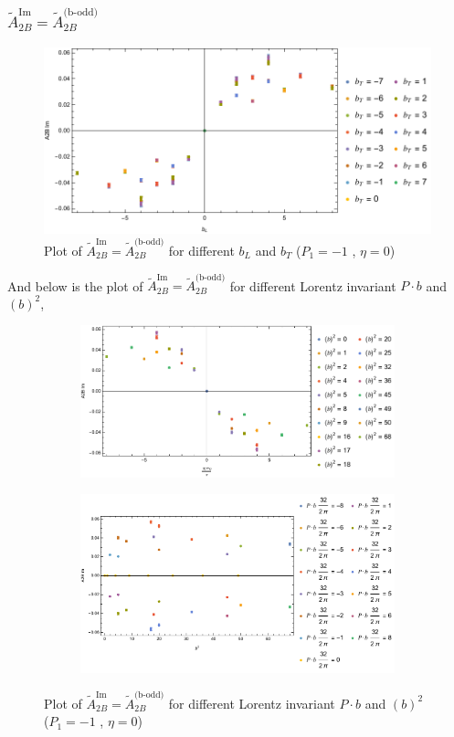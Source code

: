 \documentclass[]{article}
\numberwithin{equation}{section}
\newcommand{\tAmp}{\widetilde{A}}
\newcommand{\tAmp}{\ensuremath{\widetilde{A}^{(+)}}}
\begin{document}
\subsubsection{$\tAmp^{\text{Im}}_{2B}=\tAmp^{\text{(b-odd)}}_{2B}$}
\begin{figure}[h!]
    \centering
    \includegraphics[width=0.45\linewidth]{Amp_plots/bLbT_A2B_b_odd_P1_-1_eta_0.pdf}
    \caption{Plot of  $\tAmp^{\text{Im}}_{2B}=\tAmp^{\text{(b-odd)}}_{2B}$ for different $b_{L}$ and $b_{T}$  ($P_{1} = -1$ , $\eta=0$)}
\end{figure}

\pagebreak

And below is the plot of $\tAmp^{\text{Im}}_{2B}=\tAmp^{\text{(b-odd)}}_{2B}$ for different Lorentz invariant $P\cdot b$ and $(b)^2$,
\begin{figure}[h!]
     \centering
     \begin{subfigure}[b]{0.45\textwidth}
         \centering
         \includegraphics[width=\textwidth]{Amp_plots/bP_A2B_b_odd_P1_-1_eta_0.pdf}
     \end{subfigure}
     \begin{subfigure}[b]{0.45\textwidth}
         \centering
         \includegraphics[width=\textwidth]{Amp_plots/bsq_A2B_b_odd_P1_-1_eta_0.pdf}
     \end{subfigure}
        \caption{Plot of $\tAmp^{\text{Im}}_{2B}=\tAmp^{\text{(b-odd)}}_{2B}$ for different Lorentz invariant $P\cdot b$ and $(b)^2$  ($P_{1} = -1$ , $\eta=0$)}
\end{figure}
\end{document}
